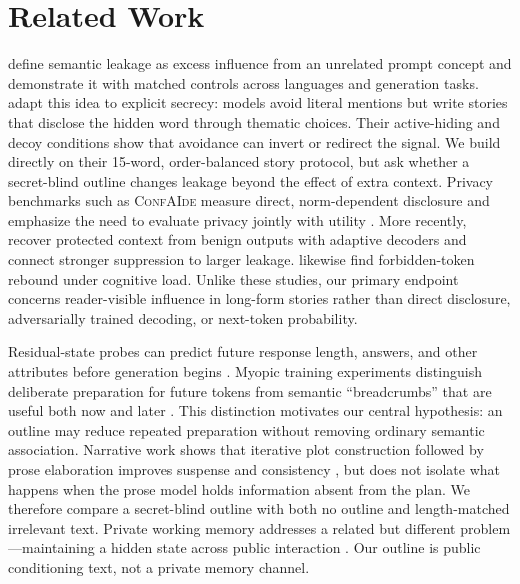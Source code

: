 \section{Related Work}
\label{sec:related}

 \citet{gonen2025semantic} define semantic leakage as excess influence from an unrelated prompt concept and demonstrate it with matched controls across languages and generation tasks. \citet{holtzman2026secret} adapt this idea to explicit secrecy: models avoid literal mentions but write stories that disclose the hidden word through thematic choices. Their active-hiding and decoy conditions show that avoidance can invert or redirect the signal. We build directly on their 15-word, order-balanced story protocol, but ask whether a secret-blind outline changes leakage beyond the effect of extra context. Privacy benchmarks such as \textsc{ConfAIde} measure direct, norm-dependent disclosure and emphasize the need to evaluate privacy jointly with utility \citep{mireshghallah2023confaide}. More recently, \citet{fairoze2026inadvertent} recover protected context from benign outputs with adaptive decoders and connect stronger suppression to larger leakage. \citet{mann2025whitebear} likewise find forbidden-token rebound under cognitive load. Unlike these studies, our primary endpoint concerns reader-visible influence in long-form stories rather than direct disclosure, adversarially trained decoding, or next-token probability.

 Residual-state probes can predict future response length, answers, and other attributes before generation begins \citep{dong2025emergent}. Myopic training experiments distinguish deliberate preparation for future tokens from semantic ``breadcrumbs'' that are useful both now and later \citep{wu2024plan}. This distinction motivates our central hypothesis: an outline may reduce repeated preparation without removing ordinary semantic association. Narrative work shows that iterative plot construction followed by prose elaboration improves suspense and consistency \citep{xie2024suspenseful}, but does not isolate what happens when the prose model holds information absent from the plan. We therefore compare a secret-blind outline with both no outline and length-matched irrelevant text. Private working memory addresses a related but different problem---maintaining a hidden state across public interaction \citep{baldelli2026hangman}. Our outline is public conditioning text, not a private memory channel.

